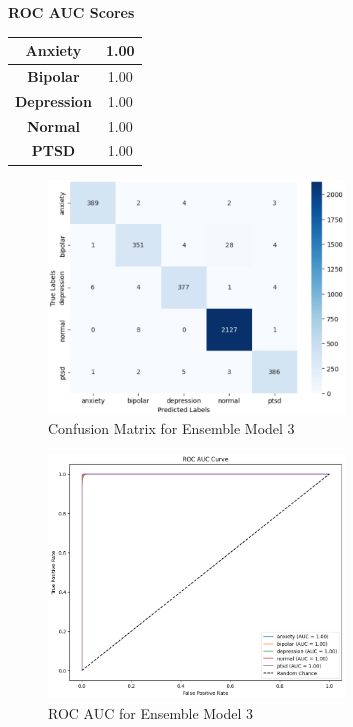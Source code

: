 \pagebreak

\begin{center}
    \textbf{ROC AUC Scores} \\[0.5em]
    \begin{tabular}{|c|c|}
        \hline
        \textbf{Anxiety} & 1.00 \\ \hline
        \textbf{Bipolar} & 1.00 \\ \hline
        \textbf{Depression} & 1.00 \\ \hline
        \textbf{Normal} & 1.00 \\ \hline
        \textbf{PTSD} & 1.00 \\ \hline
    \end{tabular}
\end{center}

\begin{figure}[h!]  
    \centering
    \includegraphics[width=0.7\textwidth]{Images/EM3 CM.png}  
    \caption{Confusion Matrix for Ensemble Model 3}
    \label{lstm arch}  %
\end{figure}

\begin{figure}[h!]  
    \centering
    \includegraphics[width=0.7\textwidth]{Images/EM3 ROC.png}  
    \caption{ROC AUC for Ensemble Model 3}
    \label{lstm arch}  %
\end{figure}

